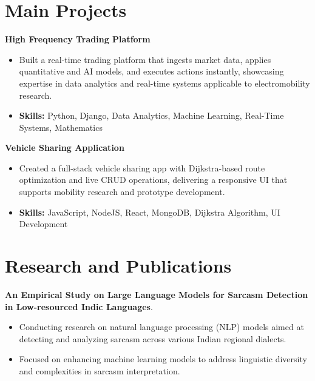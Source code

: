 \documentclass[a4paper,11pt]{article}
\begin{document}
\section{\textbf{Main Projects}}

\vspace{1mm}
  \textbf{High Frequency Trading Platform  }
\vspace{-1.5mm} %
\begin{itemize}
  \item Built a real-time trading platform that ingests market data, applies quantitative and AI models, and executes actions instantly, showcasing expertise in data analytics and real-time systems applicable to electromobility research.
\vspace{-3mm}
  \item \textbf{Skills:} Python, Django, Data Analytics, Machine Learning, Real-Time Systems, Mathematics
\end{itemize}


\vspace{1mm}
   \textbf{Vehicle Sharing Application }
\vspace{-1.5mm} %
\begin{itemize}
  \item Created a full-stack vehicle sharing app with Dijkstra-based route optimization and live CRUD operations, delivering a responsive UI that supports mobility research and prototype development.
\vspace{-3mm}
  \item \textbf{Skills:} JavaScript, NodeJS, React, MongoDB, Dijkstra Algorithm, UI Development
\end{itemize}



\section{\textbf{Research and Publications} \hfill }
\vspace{1mm}
  \textbf{An Empirical Study on Large Language Models for Sarcasm Detection in Low-resourced Indic Languages}.
\vspace{-1mm} %
\begin{itemize}
  \item Conducting research on natural language processing (NLP) models aimed at detecting and analyzing sarcasm across various Indian regional dialects.
\vspace{-3mm}
  \item Focused on enhancing machine learning models to address linguistic diversity and complexities in sarcasm interpretation.
\end{itemize}
\end{document}
